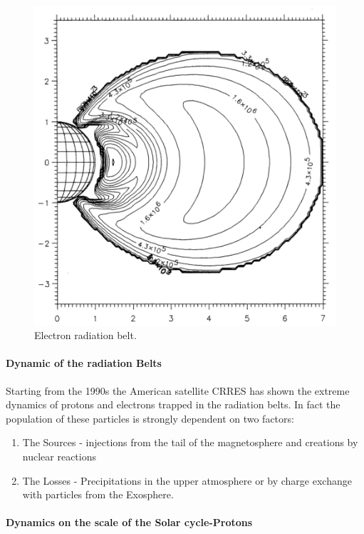 \documentclass[./dissertation.tex]{subfiles}
\begin{document}
\begin{figure}[h!]
\centering
  \includegraphics[scale = 0.50]{imgs/radbelt4.png}
  \caption{Electron radiation belt. \cite{bib2}}
  \label{fig:radbel4}
\end{figure}
%
\paragraph{Dynamic of the radiation Belts}

Starting from the 1990s the American satellite CRRES has shown the extreme dynamics of protons and electrons trapped in the radiation belts. In fact the population of these particles is strongly dependent on two factors:
\begin{enumerate}
    \item The Sources - injections from the tail of the magnetosphere and creations by nuclear reactions
    \item The Losses - Precipitations in the upper atmosphere or by charge exchange with particles from the Exosphere. 
\end{enumerate}

\paragraph{Dynamics on the scale of the Solar cycle-Protons}
\end{document}

